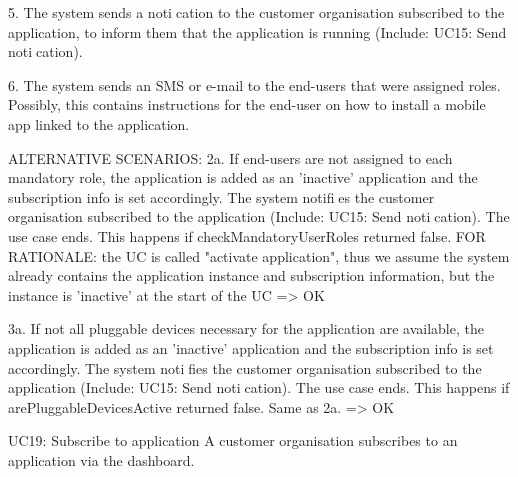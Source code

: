 {{{            5. The system sends a notication to the customer organisation subscribed to the application, to inform them that the application is running (Include: UC15: Send notication).

            6. The system sends an SMS or e-mail to the end-users that were assigned roles. Possibly, this contains instructions for the end-user on how to install a mobile app linked to the application.

            ALTERNATIVE SCENARIOS:
                2a. If end-users are not assigned to each mandatory role, the application is added as an 'inactive'
                application and the subscription info is set accordingly. The system notifies the customer
                organisation subscribed to the application (Include: UC15: Send notication). The use case ends.
                    This happens if checkMandatoryUserRoles returned false.
                    FOR RATIONALE: the UC is called "activate application", thus we assume the system already contains the
                                   application instance and subscription information, but the instance is 'inactive' at the start of the UC
                    => OK

                3a. If not all pluggable devices necessary for the application are available, the application is added
                as an 'inactive' application and the subscription info is set accordingly. The system notifies
                the customer organisation subscribed to the application (Include: UC15: Send notication). The use case ends.
                    This happens if arePluggableDevicesActive returned false.
                    Same as 2a. => OK

        UC19: Subscribe to application
            A customer organisation subscribes to an application via the dashboard.

}}}
